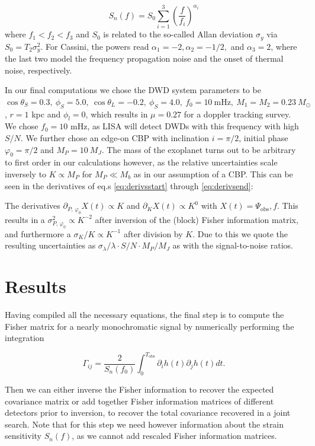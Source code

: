 \documentclass{aa}
\begin{document}
\begin{equation}
    S_n(f)=S_0 \sum_{i=1}^{3} \left( \frac{f}{f_i}\right)^{\alpha_i}
\end{equation}
where $f_1 < f_2 < f_3$ and $S_0$ is related to the so-called Allan deviation $\sigma_y$ via $S_0=T_2 \sigma_y^2$. For Cassini, the powers read $\alpha_1=-2,\alpha_2=-1/2,$ and $\alpha_3=2$, where the last two model the frequency propagation noise and the onset of thermal noise, respectively.

In our final computations we chose the DWD system parameters to be $\cos \theta_S = 0.3,\ \phi_S=5.0,\ \cos \theta_L = -0.2,\ \phi_S=4.0,\ f_0 =10\ \mathrm{mHz},\  M_1=M_2=0.23\ M_\odot$, $r=1$ kpc and $\phi_l=0$, which results in $\mu=0.27$ for a doppler tracking survey. We chose $f_0=10$ mHz, as LISA will detect DWDs with this frequency with high $S/N$. We further chose an edge-on CBP with inclination $i=\pi/2$, initial phase $\varphi_0=\pi/2$ and $M_P=10\ M_J$. The mass of the exoplanet turns out to be arbitrary to first order in our calculations however, as the relative uncertainties scale inversely to $K\propto M_P$ for $M_P \ll M_b$ as in our assumption of a CBP. This can be seen in the derivatives of eq.s \ref{eq:derivsstart} through \ref{eq:derivsend}: 

The derivatives $\partial_{P,\, \varphi_0} X(t) \propto K$ and $\partial_K X(t) \propto K^0$ with $X(t)=\Psi_\mathrm{obs}, f$. This results in a $\sigma^2_{P,\,\varphi_0}\propto K^{-2}$ after inversion of the (block) Fisher information matrix, and furthermore a $\sigma_K/K \propto K^{-1}$ after division by $K$. Due to this we quote the resulting uncertainties as $\sigma_\lambda/\lambda \cdot S/N \cdot M_P/M_J$ as with the signal-to-noise ratios.

\section{Results}
\label{sec:res}

Having compiled all the necessary equations, the final step is to compute the Fisher matrix for a nearly monochromatic signal by numerically performing the integration

\begin{equation} \label{eq:fisher}
    \Gamma_{ij} = \frac{2}{S_n(f_0)} \int_0^{T_\mathrm{obs}} \partial_i h(t) \partial_j h(t) dt.
\end{equation}

Then we can either inverse the Fisher information to recover the expected covariance matrix or add together Fisher information matrices of different detectors prior to inversion, to recover the total covariance recovered in a joint search. Note that for this step we need however information about the strain sensitivity $S_n(f)$, as we cannot add rescaled Fisher information matrices.
\end{document}
